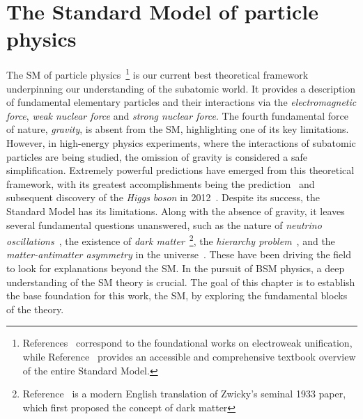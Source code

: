 \chapter{The Standard Model of particle physics}
\thispagestyle{plain}  %
\pagestyle{chapterpages}
\label{Section:Chapter1}

\minitoc

The \ac{SM} of particle physics~\cite{Glashow_1, Weinberg_1, Salam_1, MarkThompson}\footnote{References~\cite{Glashow_1, Weinberg_1, Salam_1} correspond to the foundational works on electroweak unification, while Reference~\cite{MarkThompson} provides an accessible and comprehensive textbook overview of the entire Standard Model.} is our current best theoretical framework underpinning our understanding of the subatomic world. It provides a description of fundamental elementary particles and their interactions via the \textit{electromagnetic force}, \textit{weak nuclear force} and \textit{strong nuclear force}. The fourth fundamental force of nature, \textit{gravity}, is absent from the SM, highlighting one of its key limitations. However, in high-energy physics experiments, where the interactions of subatomic particles are being studied, the omission of gravity is considered a safe simplification. Extremely powerful predictions have emerged from this theoretical framework, with its greatest accomplishments being the prediction~\cite{Englert_Brout,PeterHiggs_1,PeterHiggs_2, PeterHiggs_3, Guralnik_Hagen_Kibble, Kibble} and subsequent discovery of the \textit{Higgs boson} in 2012~\cite{Higgs_ATLAS,Higgs_CMS}. Despite its success, the Standard Model has its limitations. Along with the absence of gravity, it leaves several fundamental questions unanswered, such as the nature of \textit{neutrino oscillations}~\cite{Neutrino_Oscillations, Neutrino_Oscillations_2}, the existence of \textit{dark matter}~\cite{DarkMatter_1,DarkMatter_2,DarkMatter_3}\footnote{Reference~\cite{DarkMatter_1} is a modern English translation of Zwicky's seminal 1933 paper, which first proposed the concept of dark matter}, the \textit{hierarchy problem}~\cite{HierarchyProblem}, and the \textit{matter-antimatter asymmetry} in the universe~\cite{MatterAntimatter}. These have been driving the field to look for explanations beyond the SM. In the pursuit of \ac{BSM} physics, a deep understanding of the SM theory is crucial. The goal of this chapter is to establish the base foundation for this work, the SM, by exploring the fundamental blocks of the theory.

